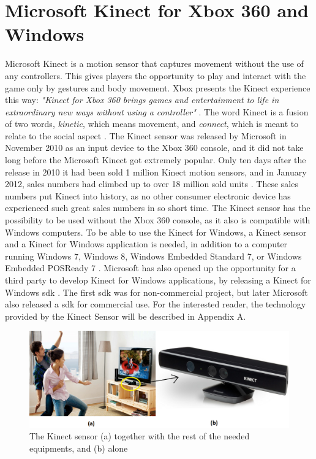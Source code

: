 \section{Microsoft Kinect for Xbox 360 and Windows}
Microsoft Kinect is a motion sensor that captures movement without the use of any controllers. This gives players the opportunity to play and interact with the game only by gestures and body movement. Xbox presents the Kinect experience this way: \emph{"Kinect for Xbox 360 brings games and entertainment to life in extraordinary new ways without using a controller"} \cite{kinectxboxdef}. The word Kinect is a fusion of two words, \emph{kinetic}, which means movement, and \emph{connect}, which is meant to relate to the social aspect \cite{howstuffworksKinect}. The Kinect sensor was released by Microsoft in November 2010 as an input device to the Xbox 360 console, and it did not take long before the Microsoft Kinect got extremely popular. Only ten days after the release in 2010 it had been sold 1 million Kinect motion sensors, and in January 2012, sales numbers had climbed up to over 18 million sold units \cite{kinectsales}. These sales numbers put Kinect into history, as no other consumer electronic device has experienced such great sales numbers in so short time. The Kinect sensor has the possibility to be used without the Xbox 360 console, as it also is compatible with Windows computers. To be able to use the Kinect for Windows, a Kinect sensor and a Kinect for Windows application is needed, in addition to a computer running Windows 7, Windows 8, Windows Embedded Standard 7, or Windows Embedded POSReady 7 \cite{kinectforwindows}. Microsoft has also opened up the opportunity for a third party to develop Kinect for Windows applications, by releasing a Kinect for Windows \ac{sdk} \cite{kinectforwindows}. The first \ac{sdk} was for non-commercial project, but later Microsoft also released a \ac{sdk} for commercial use. For the interested reader, the technology provided by the Kinect Sensor will be described in Appendix A.

\begin{figure} [ht!]
\centering
\includegraphics[scale=0.45]{sensorandtv}
\caption[The Kinect sensor]{The Kinect sensor (a) together with the rest of the needed equipments, and (b) alone}
\label{kinectsensor}
\end{figure} 
 
